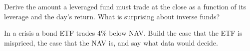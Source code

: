 \begin{interviewq}\label{iq:m1:exchange-traded-funds:5}
Derive the amount a leveraged fund must trade at the close as a function of
its leverage and the day's return. What is surprising about inverse funds?
\end{interviewq}

\begin{interviewq}\label{iq:m1:exchange-traded-funds:6}
In a crisis a bond ETF trades 4\% below NAV. Build the case that the ETF is
mispriced, the case that the NAV is, and say what data would decide.
\end{interviewq}
